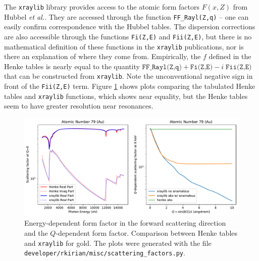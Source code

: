\documentclass[11pt]{article}
\begin{document}
The \texttt{xraylib} library\cite{schoonjansXraylibLibraryXray2011,brunettiLibraryXrayMatter2004} provides access to the atomic form factors  $F(x,Z)$  from Hubbel {\itshape et al.}\cite{hubbellAtomicFormFactors1975}.  They are accessed through the function \texttt{FF\_Rayl(Z,q)} -- one can easily confirm correspondence with the Hubbel tables.  The dispersion corrections are also accessible through the functions \texttt{Fi(Z,E)} and \texttt{Fii(Z,E)}, but there is no mathematical definition of these functions in the \texttt{xraylib} publications, nor is there an explanation of where they come from.   Empirically, the $f$ defined in the Henke tables is nearly equal to the quantity $\texttt{FF\_Rayl(Z,q)} + \texttt{Fi(Z,E)} - i\; \texttt{Fii(Z,E)}$ that can be constructed from \texttt{xraylib}.  Note the unconventional negative sign in front of the \texttt{Fii(Z,E)} term.  Figure \ref{fig:forms} shows plots comparing the tabulated Henke tables and \texttt{xraylib} functions, which shows near equality, but the Henke tables seem to have greater resolution near resonances.
\begin{figure}[htbp]
   \centering
   \includegraphics[width=\textwidth]{formfactor_79.pdf} 
   \caption{Energy-dependent form factor in the forward scattering direction and the $Q$-dependent form factor.  Comparison between Henke tables and \texttt{xraylib} for gold.  The plots were generated with the file \texttt{developer/rkirian/misc/scattering\_factors.py}.}
   \label{fig:forms}
\end{figure}


\end{document}
